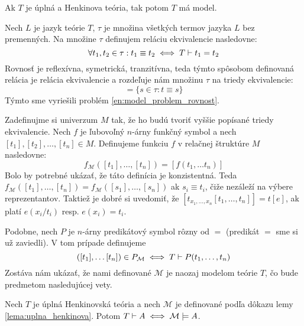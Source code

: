 \begin{lema}
    Ak $T$ je úplná a Henkinova teória, tak potom $T$ má model.
    \label{lema:uplna_henkinova}
\end{lema}
\begin{dokaz}
    Nech $L$ je jazyk teórie $T$, $\tau$ je množina všetkých
    termov jazyka $L$ bez premenných. Na množine $\tau$ definujem reláciu
    ekvivalencie nasledovne:
    \begin{equation*}
        \forall t_1, t_2 \in \tau :
            t_1 \equiv t_2 \iff T \vdash t_1 = t_2
    \end{equation*}
    Rovnosť je reflexívna, symetrická, tranzitívna, teda týmto
    spôsobom definovaná relácia je relácia ekvivalencie a rozdeľuje
    nám množinu $\tau$ na triedy ekvivalencie:
    \begin{equation*}
        [t] = \{ s \in \tau: t \equiv s\}
    \end{equation*}
    Týmto sme vyriešili problém \ref{en:model_problem_rovnost}.

    Zadefinujme si univerzum $M$ tak, že ho budú tvoriť vyššie popísané
    triedy ekvivalencie.
    Nech $f$ je ľubovoľný $n$-árny funkčný symbol a nech
     $[t_1], [t_2], \ldots, [t_n] \in M$. Definujeme funkciu $f$ v relačnej
     štruktúre $M$ nasledovne:
     \begin{equation*}
      f_\mathcal{M}([t_1], \dots, [t_n]) = [f(t_1, \dots t_n)]
     \end{equation*}
    Bolo by potrebné ukázať, že táto definícia je konzistentná. Teda
    $f_\mathcal{M}([t_1], \dots, [t_n])=f_\mathcal{M}([s_1], \dots, [s_n])$
    ak $s_i \equiv t_i$, čiže nezáleží na výbere reprezentantov.
    Taktiež je dobré si uvedomiť, že
    $[t_{x_1,\dots,x_n}[t_1,\dots,t_n]]=t[e]$, ak platí $e(x_i/t_i)$ resp.
    $e(x_i)=t_i$.

    Podobne, nech $P$ je $n$-árny predikátový symbol rôzny od $=$
    (predikát $=$ sme si už zaviedli). V tom prípade definujeme
    \begin{equation*}
     ([t_1], \ldots [t_n]) \in P_\mathcal{M} \iff
        T \vdash P(t_1, \ldots, t_n)
    \end{equation*}
    Zostáva nám ukázať, že nami definované $\mathcal{M}$ je
    naozaj modelom teórie $T$, čo bude predmetom nasledujúcej vety.
\end{dokaz}

\begin{veta}
    Nech $T$ je úplná Henkinovská teória a nech $\mathcal{M}$ je
    definované podľa dôkazu lemy \ref{lema:uplna_henkinova}.
    Potom $T \vdash A \iff \mathcal{M} \models A$.
\end{veta}

